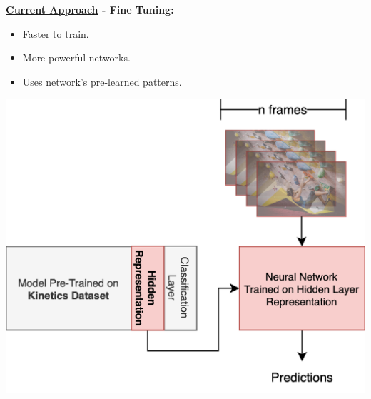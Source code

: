 \begin{frame}
    \begin{minipage}{0.45\textwidth}
        \textbf{\underline{Current Approach} - Fine Tuning:}

        \vspace{0.5em}
        
        \begin{itemize}
            \item Faster to train.
            \item More powerful networks.
            \item Uses network's pre-learned patterns.
        \end{itemize}

        \vspace{0.5em}

    \end{minipage}%
    \hfill
    \begin{minipage}{0.45\textwidth}
        \centering
        \includegraphics[width=\textwidth]{assets/visuals/fine-tuning-approach.drawio.png}

    \end{minipage}
\end{frame}


